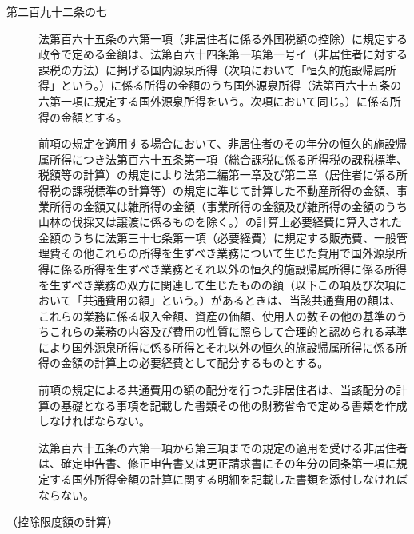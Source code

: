 \documentclass[twocolumn,a4j,10pt]{ltjtarticle}
\begin{document}
\begin{description}
\item[第二百九十二条の七]法第百六十五条の六第一項（非居住者に係る外国税額の控除）に規定する政令で定める金額は、法第百六十四条第一項第一号イ（非居住者に対する課税の方法）に掲げる国内源泉所得（次項において「恒久的施設帰属所得」という。）に係る所得の金額のうち国外源泉所得（法第百六十五条の六第一項に規定する国外源泉所得をいう。次項において同じ。）に係る所得の金額とする。
\item[]前項の規定を適用する場合において、非居住者のその年分の恒久的施設帰属所得につき法第百六十五条第一項（総合課税に係る所得税の課税標準、税額等の計算）の規定により法第二編第一章及び第二章（居住者に係る所得税の課税標準の計算等）の規定に準じて計算した不動産所得の金額、事業所得の金額又は雑所得の金額（事業所得の金額及び雑所得の金額のうち山林の伐採又は譲渡に係るものを除く。）の計算上必要経費に算入された金額のうちに法第三十七条第一項（必要経費）に規定する販売費、一般管理費その他これらの所得を生ずべき業務について生じた費用で国外源泉所得に係る所得を生ずべき業務とそれ以外の恒久的施設帰属所得に係る所得を生ずべき業務の双方に関連して生じたものの額（以下この項及び次項において「共通費用の額」という。）があるときは、当該共通費用の額は、これらの業務に係る収入金額、資産の価額、使用人の数その他の基準のうちこれらの業務の内容及び費用の性質に照らして合理的と認められる基準により国外源泉所得に係る所得とそれ以外の恒久的施設帰属所得に係る所得の金額の計算上の必要経費として配分するものとする。
\item[]前項の規定による共通費用の額の配分を行つた非居住者は、当該配分の計算の基礎となる事項を記載した書類その他の財務省令で定める書類を作成しなければならない。
\item[]法第百六十五条の六第一項から第三項までの規定の適用を受ける非居住者は、確定申告書、修正申告書又は更正請求書にその年分の同条第一項に規定する国外所得金額の計算に関する明細を記載した書類を添付しなければならない。
\end{description}
\noindent\hspace{10pt}（控除限度額の計算）
\end{document}

